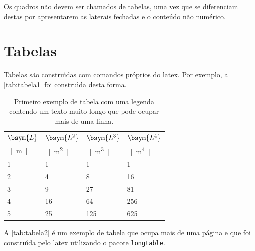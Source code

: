 Os quadros n\~ao devem ser chamados de tabelas, uma vez que se diferenciam destas por apresentarem as laterais fechadas e o conte\'udo n\~ao num\'erico.

\section{Tabelas}\label{sec:tabelas}

Tabelas s\~ao constru\'{\i}das com comandos pr\'oprios do \gls{latex}. Por exemplo, a \autoref{tab:tabela1} foi constru\'{\i}da desta forma.

\begin{table}[Htb]%
\caption{Primeiro exemplo de tabela com uma legenda contendo um texto muito longo que pode ocupar mais de uma linha.}%
\label{tab:tabela1}%
\begin{tabularx}{\textwidth}{@{\extracolsep{\fill}}llll}%
\toprule
$\bsym{L}$ & $\bsym{L^2}$ & $\bsym{L^3}$ & $\bsym{L^4}$ \\
\SI{}{[m]} & \SI{}{[m^2]} & \SI{}{[m^3]} & \SI{}{[m^4]} \\ \midrule
1          & 1            & 1            & 1            \\
2          & 4            & 8            & 16           \\
3          & 9            & 27           & 81           \\
4          & 16           & 64           & 256          \\
5          & 25           & 125          & 625          \\ \bottomrule
\end{tabularx}
\end{table}

A \autoref{tab:tabela2} \'e um exemplo de tabela que ocupa mais de uma p\'agina e que foi constru\'{\i}da pelo \gls{latex} utilizando o pacote \texttt{longtable}.

